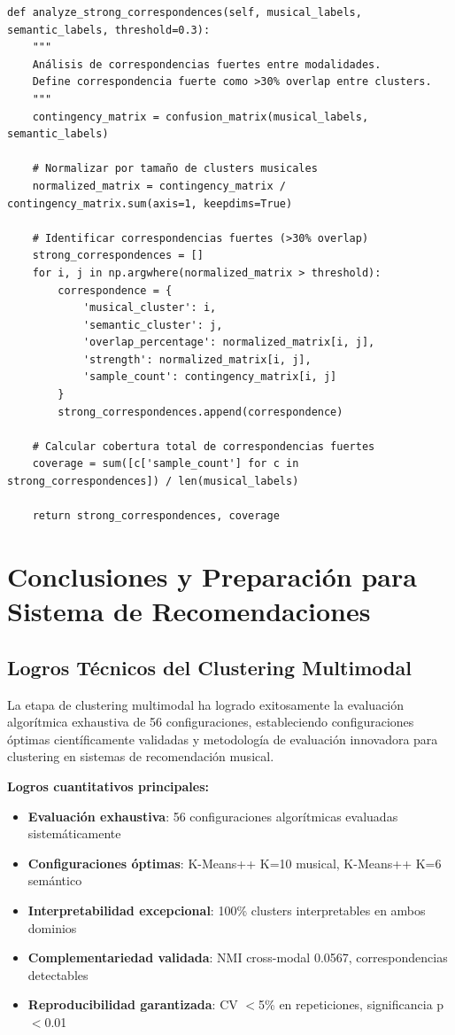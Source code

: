 \documentclass[12pt,a4paper]{report}
\begin{document}
\begin{lstlisting}[caption={Protocolo de Correspondencias Cross-Modal}]
def analyze_strong_correspondences(self, musical_labels, semantic_labels, threshold=0.3):
    """
    Análisis de correspondencias fuertes entre modalidades.
    Define correspondencia fuerte como >30% overlap entre clusters.
    """
    contingency_matrix = confusion_matrix(musical_labels, semantic_labels)

    # Normalizar por tamaño de clusters musicales
    normalized_matrix = contingency_matrix / contingency_matrix.sum(axis=1, keepdims=True)

    # Identificar correspondencias fuertes (>30% overlap)
    strong_correspondences = []
    for i, j in np.argwhere(normalized_matrix > threshold):
        correspondence = {
            'musical_cluster': i,
            'semantic_cluster': j,
            'overlap_percentage': normalized_matrix[i, j],
            'strength': normalized_matrix[i, j],
            'sample_count': contingency_matrix[i, j]
        }
        strong_correspondences.append(correspondence)

    # Calcular cobertura total de correspondencias fuertes
    coverage = sum([c['sample_count'] for c in strong_correspondences]) / len(musical_labels)

    return strong_correspondences, coverage
\end{lstlisting}

\section{Conclusiones y Preparación para Sistema de Recomendaciones}

\subsection{Logros Técnicos del Clustering Multimodal}

La etapa de clustering multimodal ha logrado exitosamente la evaluación algorítmica exhaustiva de 56 configuraciones, estableciendo configuraciones óptimas científicamente validadas y metodología de evaluación innovadora para clustering en sistemas de recomendación musical.

\textbf{Logros cuantitativos principales:}
\begin{itemize}
    \item \textbf{Evaluación exhaustiva}: 56 configuraciones algorítmicas evaluadas sistemáticamente
    \item \textbf{Configuraciones óptimas}: K-Means++ K=10 musical, K-Means++ K=6 semántico
    \item \textbf{Interpretabilidad excepcional}: 100\% clusters interpretables en ambos dominios
    \item \textbf{Complementariedad validada}: NMI cross-modal 0.0567, correspondencias detectables
    \item \textbf{Reproducibilidad garantizada}: CV $<$5\% en repeticiones, significancia p$<$0.01
\end{itemize}
\end{document}
